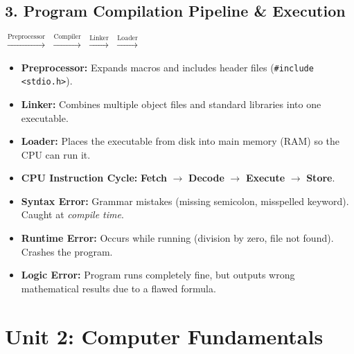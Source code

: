 \documentclass[a4paper,11pt]{article}
\begin{document}
\subsection{3. Program Compilation Pipeline \& Execution}
\begin{center}
 $\xrightarrow{\text{Preprocessor}}$  $\xrightarrow{\text{Compiler}}$  $\xrightarrow{\text{Linker}}$  $\xrightarrow{\text{Loader}}$ 
\end{center}
\begin{itemize}[leftmargin=5mm]
    \item \textbf{Preprocessor:} Expands macros and includes header files (\texttt{\#include <stdio.h>}).
    \item \textbf{Linker:} Combines multiple object files and standard libraries into one executable.
    \item \textbf{Loader:} Places the executable from disk into main memory (RAM) so the CPU can run it.
    \item \textbf{CPU Instruction Cycle:} \textbf{Fetch} $\rightarrow$ \textbf{Decode} $\rightarrow$ \textbf{Execute} $\rightarrow$ \textbf{Store}.
\end{itemize}

\begin{examalert}
\begin{itemize}[leftmargin=5mm]
    \item \textbf{Syntax Error:} Grammar mistakes (missing semicolon, misspelled keyword). Caught at \textit{compile time}.
    \item \textbf{Runtime Error:} Occurs while running (division by zero, file not found). Crashes the program.
    \item \textbf{Logic Error:} Program runs completely fine, but outputs wrong mathematical results due to a flawed formula.
\end{itemize}
\end{examalert}

\newpage

\section{Unit 2: Computer Fundamentals}
\end{document}
